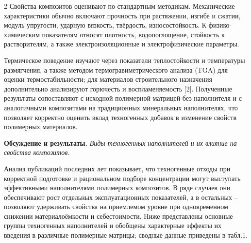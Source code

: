 \begin{multicols}{2}
Свойства композитов оценивают по стандартным методикам. Механические
характеристики обычно включают прочность при растяжении, изгибе и
сжатии, модуль упругости, ударную вязкость, твёрдость, износостойкость.
К физико-химическим показателям относят плотность, водопоглощение,
стойкость к растворителям, а также электроизоляционные и
электрофизические параметры.

Термическое поведение изучают через показатели теплостойкости и
температуры размягчения, а также методом термогравиметрического анализа
(TGA) для оценки термостабильности; для материалов строительного
назначения дополнительно анализируют горючесть и воспламеняемость
{[}2{]}. Полученные результаты сопоставляют с исходной полимерной
матрицей без наполнителя и с аналогичными композитами на традиционных
минеральных наполнителях, что позволяет корректно оценить вклад
техногенных добавок в изменение свойств полимерных материалов.

{\bfseries Обсуждение и результаты.} \emph{Виды техногенных наполнителей и
их влияние на свойства композитов.}

Анализ публикаций последних лет показывает, что техногенные отходы при
корректной подготовке и рациональном подборе концентрации могут
выступать эффективными наполнителями полимерных композитов. В ряде
случаев они обеспечивают рост отдельных эксплуатационных показателей, а
в остальных -- позволяют удерживать свойства на приемлемом уровне при
одновременном снижении материалоёмкости и себестоимости. Ниже
представлены основные группы техногенных наполнителей и обобщены
характерные эффекты их введения в различные полимерные матрицы; сводные
данные приведены в табл.1.
\end{multicols}

